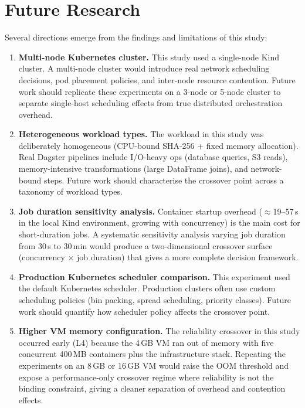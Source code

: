 
\section{Future Research}
\label{sec:future-research}

Several directions emerge from the findings and limitations of this study:

\begin{enumerate}
  \item \textbf{Multi-node Kubernetes cluster.}
  This study used a single-node Kind cluster.
  A multi-node cluster would introduce real network scheduling decisions, pod placement policies, and inter-node resource contention.
  Future work should replicate these experiments on a 3-node or 5-node cluster to separate single-host scheduling effects from true distributed orchestration overhead.

  \item \textbf{Heterogeneous workload types.}
  The workload in this study was deliberately homogeneous (CPU-bound SHA-256 + fixed memory allocation).
  Real Dagster pipelines include I/O-heavy ops (database queries, S3 reads), memory-intensive transformations (large DataFrame joins), and network-bound steps.
  Future work should characterise the crossover point across a taxonomy of workload types.

  \item \textbf{Job duration sensitivity analysis.}
  Container startup overhead ($\approx$19--57\,s in the local Kind environment, growing with concurrency) is the main cost for short-duration jobs.
  A systematic sensitivity analysis varying job duration from 30\,s to 30\,min would produce a two-dimensional crossover surface (concurrency $\times$ job duration) that gives a more complete decision framework.

  \item \textbf{Production Kubernetes scheduler comparison.}
  This experiment used the default Kubernetes scheduler.
  Production clusters often use custom scheduling policies (bin packing, spread scheduling, priority classes).
  Future work should quantify how scheduler policy affects the crossover point.

  \item \textbf{Higher VM memory configuration.}
  The reliability crossover in this study occurred early (L4) because the 4\,GB VM ran out of memory with five concurrent 400\,MB containers plus the infrastructure stack.
  Repeating the experiments on an 8\,GB or 16\,GB VM would raise the OOM threshold and expose a performance-only crossover regime where reliability is not the binding constraint, giving a cleaner separation of overhead and contention effects.


\end{enumerate}
